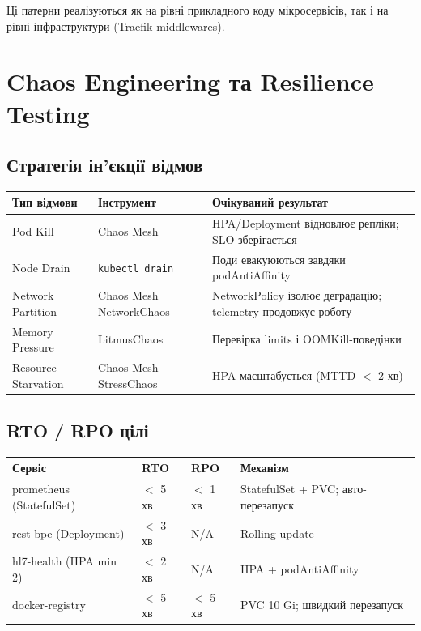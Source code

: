 \documentclass[12pt,a4paper]{article}
\begin{document}
Ці патерни реалізуються як на рівні прикладного коду мікросервісів, так і на рівні інфраструктури (Traefik middlewares).

\newpage
\section{Chaos Engineering та Resilience Testing}

\subsection{Стратегія ін'єкції відмов}

\begin{longtable}{L{3.5cm} L{3cm} L{7.5cm}}
\toprule
{}
\color{primary}\textbf{Тип відмови} &
\color{primary}\textbf{Інструмент} &
\color{primary}\textbf{Очікуваний результат} \\
\midrule\endhead\bottomrule\endfoot
Pod Kill & Chaos Mesh
  & HPA/Deployment відновлює репліки; SLO зберігається \\[4pt]
Node Drain & \texttt{kubectl drain}
  & Поди евакуюються завдяки podAntiAffinity \\[4pt]
Network Partition & Chaos Mesh NetworkChaos
  & NetworkPolicy ізолює деградацію; telemetry продовжує роботу \\[4pt]
Memory Pressure & LitmusChaos
  & Перевірка limits і OOMKill-поведінки \\[4pt]
Resource Starvation & Chaos Mesh StressChaos
  & HPA масштабується (MTTD $<$ 2 хв) \\[4pt]
\end{longtable}

\subsection{RTO / RPO цілі}

\begin{longtable}{L{3.8cm} C{2.5cm} C{2.5cm} L{5.2cm}}
\toprule
{}
\color{primary}\textbf{Сервіс} &
\color{primary}\textbf{RTO} &
\color{primary}\textbf{RPO} &
\color{primary}\textbf{Механізм} \\
\midrule\endhead\bottomrule\endfoot
prometheus (StatefulSet) & $<$ 5 хв & $<$ 1 хв & StatefulSet + PVC; авто-перезапуск \\[2pt]
rest-bpe (Deployment) & $<$ 3 хв & N/A & Rolling update \\[2pt]
hl7-health (HPA min 2) & $<$ 2 хв & N/A & HPA + podAntiAffinity \\[2pt]
docker-registry & $<$ 5 хв & $<$ 5 хв & PVC 10 Gi; швидкий перезапуск \\[2pt]
\end{longtable}
\end{document}
